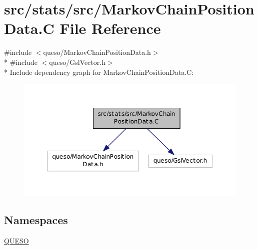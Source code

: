\hypertarget{_markov_chain_position_data_8_c}{\section{src/stats/src/\-Markov\-Chain\-Position\-Data.C File Reference}
\label{_markov_chain_position_data_8_c}
}
{\ttfamily \#include $<$queso/\-Markov\-Chain\-Position\-Data.\-h$>$}\\*
{\ttfamily \#include $<$queso/\-Gsl\-Vector.\-h$>$}\\*
Include dependency graph for Markov\-Chain\-Position\-Data.\-C\-:
\nopagebreak
\begin{figure}[H]
\begin{center}
\leavevmode
\includegraphics[width=350pt]{_markov_chain_position_data_8_c__incl}
\end{center}
\end{figure}
\subsection*{Namespaces}
\begin{DoxyCompactItemize}
\item 
\hyperlink{namespace_q_u_e_s_o}{Q\-U\-E\-S\-O}
\end{DoxyCompactItemize}
